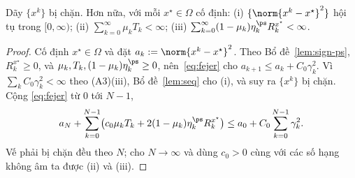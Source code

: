 \begin{lemma}\label{lem:bounded}
Dãy $\{x^k\}$ bị chặn. Hơn nữa, với mỗi $x^\star\in\Omega$ cố định:
\textup{(i)} $\{\norm{x^k-x^\star}^2\}$ hội tụ trong $[0,\infty)$;
\textup{(ii)} $\sum_{k=0}^\infty\mu_k T_k<\infty$;
\textup{(iii)} $\sum_{k=0}^\infty(1-\mu_k)\eta^{\ps}_k R^{x^\star}_k<\infty$.
\end{lemma}
\begin{proof}
Cố định $x^\star\in\Omega$ và đặt $a_k:=\norm{x^k-x^\star}^2$. Theo Bổ đề~\ref{lem:sign-ps},
$R^{x^\star}_k\ge0$, và $\mu_k,T_k,(1-\mu_k)\eta^{\ps}_k\ge0$, nên~\eqref{eq:fejer} cho
$a_{k+1}\le a_k+C_0\gamma_k^2$. Vì $\sum_k C_0\gamma_k^2<\infty$ theo (A3)(iii),
Bổ đề~\ref{lem:seq} cho (i), và suy ra $\{x^k\}$ bị chặn. Cộng
\eqref{eq:fejer} từ $0$ tới $N-1$,
\[
a_N+\sum_{k=0}^{N-1}\bigl(c_0\mu_k T_k+2(1-\mu_k)\eta^{\ps}_k R^{x^\star}_k\bigr)\le a_0+C_0\sum_{k=0}^{N-1}\gamma_k^2 .
\]
Vế phải bị chặn đều theo $N$; cho $N\to\infty$ và dùng $c_0>0$ cùng với
các số hạng không âm ta được (ii) và (iii).
\end{proof}

